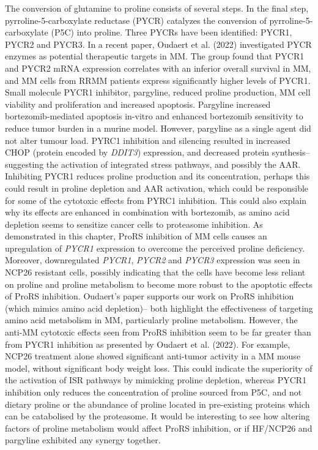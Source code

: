 The conversion of glutamine to proline consists of several steps.
In the final step, pyrroline-5-carboxylate reductase (PYCR) catalyzes the conversion of pyrroline-5-carboxylate (P5C) into proline.
Three PYCRs have been identified: PYCR1, PYCR2 and PYCR3.
In a recent paper, Oudaert et al. (2022) investigated PYCR enzymes as potential therapeutic targets in MM\cite{oudaert2022pyrroline}.
The group found that PYCR1 and PYCR2 mRNA expression correlates with an inferior overall survival in MM, and MM cells from RRMM patients express significantly higher levels of PYCR1\@.
Small molecule PYCR1 inhibitor, pargyline, reduced proline production, MM cell viability and proliferation and increased apoptosis.
Pargyline increased bortezomib-mediated apoptosis in-vitro and enhanced bortezomib sensitivity to reduce tumor burden in a murine model.
However, pargyline as a single agent did not alter tumour load.
PYRC1 inhibition and silencing resulted in increased CHOP (protein encoded by \textit{DDIT3}) expression, and decreased protein synthesis-- suggesting the activation of integrated stress pathways, and possibly the AAR.
Inhibiting PYCR1 reduces proline production and its concentration, perhaps this could result in proline depletion and AAR activation, which could be responsible for some of the cytotoxic effects from PYRC1 inhibition.
This could also explain why its effects are enhanced in combination with bortezomib, as amino acid depletion seems to sensitize cancer cells to proteasome inhibition\cite{mizrachy2010amino}.
As demonstrated in this chapter, ProRS inhibition of MM cells causes an upregulation of \textit{PYCR1} expression to overcome the perceived proline deficiency.
Moreover, downregulated \textit{PYCR1}, \textit{PYCR2} and \textit{PYCR3} expression was seen in NCP26 resistant cells, possibly indicating that the cells have become less reliant on proline and proline metabolism to become more robust to the apoptotic effects of ProRS inhibition.
Oudaert's paper supports our work on ProRS inhibition (which mimics amino acid depletion)-- both highlight the effectiveness of targeting amino acid metabolism in MM, particularly proline metabolism.
However, the anti-MM cytotoxic effects seen from ProRS inhibition seem to be far greater than from PYCR1 inhibition as presented by Oudaert et al. (2022).
For example, NCP26 treatment alone showed significant anti-tumor activity in a MM mouse model, without significant body weight loss\cite{bottpreclinical2022}.
This could indicate the superiority of the activation of ISR pathways by mimicking proline depletion, whereas PYCR1 inhibition only reduces the concentration of proline sourced from P5C, and not dietary proline or the abundance of proline located in pre-existing proteins which can be catabolised by the proteasome.
It would be interesting to see how altering factors of proline metabolism would affect ProRS inhibition, or if HF/NCP26 and pargyline exhibited any synergy together.

